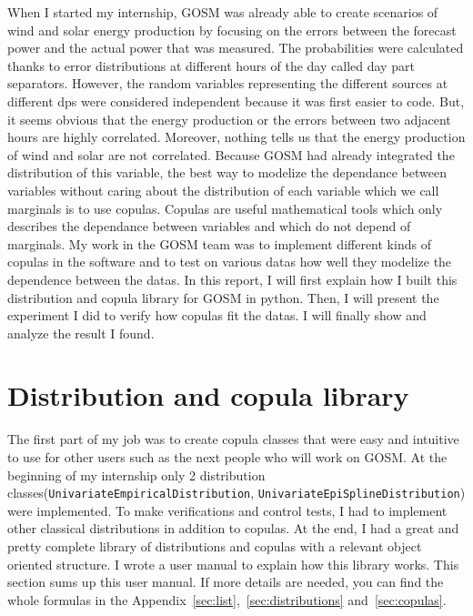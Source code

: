 \documentclass{article}
\begin{document}
	When I started my internship, GOSM was already able to create scenarios of wind and solar energy production by focusing on the errors between the forecast power and the actual power that was measured. The probabilities were calculated thanks to error distributions at different hours of the day called day part separators. However, the random variables representing the different sources at different dps were considered independent because it was first easier to code. But, it seems obvious that the energy production or the errors  between two adjacent hours are highly correlated. Moreover, nothing tells us that the energy production of wind and solar are not correlated. Because GOSM had already integrated the distribution of this variable, the best way to modelize the dependance between variables without caring about the distribution of each variable which we call marginals is to use copulas. Copulas are useful mathematical tools which only describes the dependance between variables and which do not depend of marginals. My work in the GOSM team was to implement different kinds of copulas in the software and to test on various datas how well they modelize the dependence between the datas. In this report, I will first explain how I built this distribution and copula library for GOSM in python. Then, I will present the experiment I did to verify how copulas fit the datas. I will finally show and analyze the result I found.
	
	\newpage
	
	\section{Distribution and copula library}
	
	The first part of my job was to create copula classes that were easy and intuitive to use for other users such as the next people who will work on GOSM. At the beginning of my internship only 2 distribution classes(\texttt{UnivariateEmpiricalDistribution}, \texttt{UnivariateEpiSplineDistribution}) were implemented. To make verifications and control tests, I had to implement other classical distributions in addition to copulas. At the end, I had a great and pretty complete library of distributions and copulas with a relevant object oriented structure. I wrote a user manual to explain how this library works. This section sums up this user manual. If more details are needed, you can find the whole formulas in the Appendix~\ref{sec:list},~\ref{sec:distributions} and~\ref{sec:copulas}.
	
\end{document}
